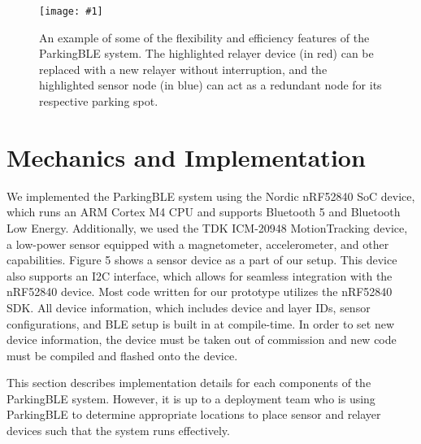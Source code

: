 \documentclass[sigconf]{acmart}
\def\mediumcolfig#1{\texttt{[image: \#1]}}
\begin{document}
\begin{figure}
  \centerline{\mediumcolfig{figs/flex.pdf}}
    \caption{An example of some of the flexibility and efficiency features
    of the ParkingBLE system. The highlighted relayer device (in red) can
    be replaced with a new relayer without interruption, and the highlighted
    sensor node (in blue) can act as a redundant node for its respective
    parking spot.}
    \label{fig:webserver}
\end{figure}


\section{Mechanics and Implementation}
We implemented the ParkingBLE system using the Nordic nRF52840 SoC device,
which runs an ARM Cortex M4 CPU and supports Bluetooth 5 and Bluetooth Low Energy.
Additionally, we used the TDK ICM-20948 MotionTracking device, a low-power
sensor equipped with a magnetometer, accelerometer, and other capabilities.
Figure 5 shows a sensor device as a part of our setup.
This device also supports an I2C interface, which allows for seamless
integration with the nRF52840 device. Most code written for our prototype
utilizes the nRF52840 SDK. All device information, which includes device
and layer IDs, sensor configurations, and BLE setup is built in at
compile-time. In order to set new device information, the device must be
taken out of commission and new code must be compiled and
flashed onto the device. \newline

This section describes implementation details for each components of the
ParkingBLE system. However, it is up to a deployment team who is using
ParkingBLE to determine appropriate locations to place sensor and relayer
devices such that the system runs effectively.
\end{document}
